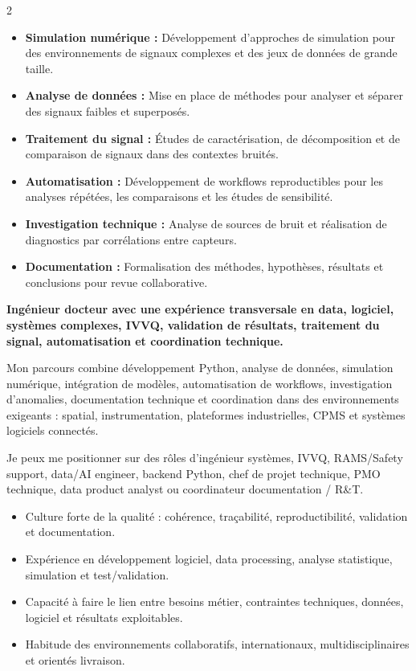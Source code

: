 \documentclass[8pt,a4paper,ragged2e,withhyper]{altacv}
\begin{document}
\begin{paracol}{2}
\begin{itemize}
  \item \textbf{Simulation numérique :} Développement d'approches de simulation pour des environnements de signaux complexes et des jeux de données de grande taille.
  \item \textbf{Analyse de données :} Mise en place de méthodes pour analyser et séparer des signaux faibles et superposés.
  \item \textbf{Traitement du signal :} Études de caractérisation, de décomposition et de comparaison de signaux dans des contextes bruités.
  \item \textbf{Automatisation :} Développement de workflows reproductibles pour les analyses répétées, les comparaisons et les études de sensibilité.
  \item \textbf{Investigation technique :} Analyse de sources de bruit et réalisation de diagnostics par corrélations entre capteurs.
  \item \textbf{Documentation :} Formalisation des méthodes, hypothèses, résultats et conclusions pour revue collaborative.
\end{itemize}

\switchcolumn


\textbf{Ingénieur docteur avec une expérience transversale en data, logiciel, systèmes complexes, IVVQ, validation de résultats, traitement du signal, automatisation et coordination technique.}

Mon parcours combine développement Python, analyse de données, simulation numérique, intégration de modèles, automatisation de workflows, investigation d'anomalies, documentation technique et coordination dans des environnements exigeants : spatial, instrumentation, plateformes industrielles, CPMS et systèmes logiciels connectés.

Je peux me positionner sur des rôles d'ingénieur systèmes, IVVQ, RAMS/Safety support, data/AI engineer, backend Python, chef de projet technique, PMO technique, data product analyst ou coordinateur documentation / R\&T.

\begin{itemize}
  \item Culture forte de la qualité : cohérence, traçabilité, reproductibilité, validation et documentation.
  \item Expérience en développement logiciel, data processing, analyse statistique, simulation et test/validation.
  \item Capacité à faire le lien entre besoins métier, contraintes techniques, données, logiciel et résultats exploitables.
  \item Habitude des environnements collaboratifs, internationaux, multidisciplinaires et orientés livraison.
\end{itemize}


\end{paracol}
\end{document}

